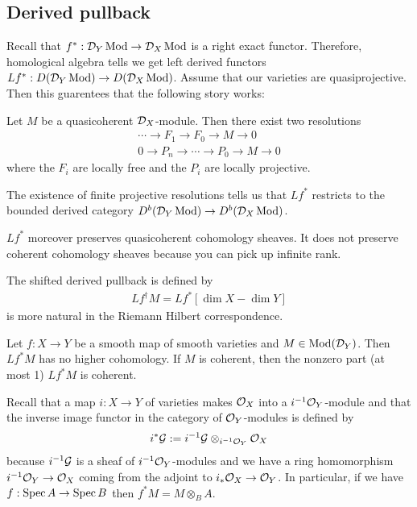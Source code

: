 \subsection{Derived pullback}
Recall that $f^*:{\mathcal{D}}_Y\operatorname{Mod} \to {\mathcal{D}}_X\operatorname{Mod}$ is a right exact functor. Therefore,
homological algebra tells we get left derived functors $Lf^*:D({\mathcal{D}}_Y\operatorname{Mod}) \to D({\mathcal{D}}_X\operatorname{Mod})$.
Assume that our varieties are quasiprojective. Then this guarentees that
the following story works:

\begin{proposition}
	Let $M$ be a quasicoherent ${\mathcal{D}}_X$-module. Then there
	exist two resolutions
	\begin{align*}
		\cdots \to F_1 \to F_0 \to M \to 0 \\
		0 \to P_n \to \cdots \to P_0 \to M \to 0
	\end{align*} where the $F_i$ are locally free and the $P_i$ are locally projective.
\end{proposition}
The existence of finite projective resolutions tells us that $Lf^*$ restricts to the bounded
derived category $D^b({\mathcal{D}}_Y\operatorname{Mod}) \to D^b({\mathcal{D}}_X\operatorname{Mod})$.


\begin{proposition}
	$Lf^*$ moreover preserves quasicoherent cohomology sheaves. It does not
	preserve coherent cohomology sheaves because you can pick up infinite rank.
\end{proposition}

\begin{definition}
	The shifted derived pullback is defined by \begin{align*}
		Lf^\dagger M = Lf^*[\dim X - \dim Y]
	\end{align*} is more natural in the Riemann Hilbert correspondence.
\end{definition}

\begin{proposition}
	Let $f:X\to Y$ be a smooth map of smooth varieties and $M\in \operatorname{Mod}({\mathcal{D}}_Y)$. Then
	$Lf^*M$ has no higher cohomology. If $M$ is coherent, then the nonzero part (at most 1)
	$Lf^*M$ is coherent.
\end{proposition}

Recall that a map $i:X\to Y$ of varieties
makes ${\mathcal{O}}_X$ into a $i^{-1}{\mathcal{O}}_Y$-module and that
the inverse image functor in the category of ${\mathcal{O}}_Y$-modules is defined by \begin{align*}
	i^*{\mathcal{G}} := i^{-1}{\mathcal{G}} \otimes_{i^{-1}{\mathcal{O}}_Y} {\mathcal{O}}_X
\end{align*} because $i^{-1}{\mathcal{G}}$ is a sheaf of $i^{-1}{\mathcal{O}}_Y$-modules and
we have a ring homomorphism $i^{-1}{\mathcal{O}}_Y \to {\mathcal{O}}_X$ coming from the adjoint to $i_*{\mathcal{O}}_X \to {\mathcal{O}}_Y$.
In particular, if we have $f:\operatorname{Spec} A \to \operatorname{Spec} B$ then $f^*M = M\otimes_B A$.

